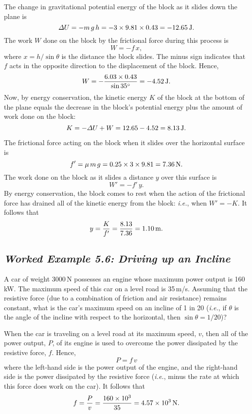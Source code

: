 The change in gravitational potential energy of the block as it slides down the
plane is
$$
{\mit\Delta}U = -m\,g\,h = - 3\times 9.81 \times 0.43 = -12.65\,{\rm J}.
$$
The work $W$ done on the block  by the 
frictional force during this process is
$$
W = -f\,x,
$$
where $x= h/\sin\theta$ is the distance the block slides.
The minus sign indicates that $f$ acts in the opposite direction to the displacement of the block. 
Hence,
$$
W = -\frac{6.03 \times 0.43 }{\sin 35^\circ} =- 4.52\,{\rm J}.
$$
Now, by energy conservation, the kinetic energy $K$ of the block at the bottom of the plane
equals the decrease in the block's potential energy plus the amount
of work done on the block:
$$
K = - {\mit\Delta}U + W = 12.65 - 4.52 = 8.13\,{\rm J}.
$$

The frictional force acting on the block when it slides over the horizontal
surface is
$$
f' = \mu\,m\,g = 0.25\times 3\times 9.81 = 7.36\,{\rm N}.
$$
The work done on the block as it slides a distance $y$ over this
surface is
$$
W' = -f'\,y.
$$
By energy conservation, the block comes to rest when the action of the frictional force has
drained all of the kinetic energy from the block: {\em i.e.}, when $W'=-K$. It follows
that
$$
y = \frac{K}{f'} = \frac{8.13}{7.36} = 1.10\,{\rm m}.
$$

\subsection*{\em Worked Example 5.6: Driving up an Incline}
 A car of weight 3000\,N possesses an engine whose maximum
power output is 160\,kW. The maximum speed of this car on a
level road is 35\,m/s. Assuming that the
resistive force (due to a combination of friction and
air resistance) remains constant, what is the car's maximum
speed on an incline of 1 in 20 ({\em i.e.}, if $\theta$
is the angle of the incline with respect to the horizontal, then
$\sin\theta = 1/20$)?

When the car is traveling on a level road at its maximum speed, $v$, then all
of the power output, $P$, of its engine is used to overcome the power
dissipated by the resistive force, $f$. Hence,
$$
P = f\,v
$$
where the left-hand side is the power output of the engine, and the right-hand side
is the power dissipated by the resistive force ({\em i.e.}, minus the rate at which
this force does work on the car). It follows that
$$
f = \frac{P}{v} = \frac{160\times 10^3}{35} = 4.57\times 10^3\,{\rm N}.
$$


